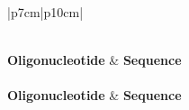 \footnotesize
\begin{longtable}[l]{ |p{7cm}|p{10cm}| }
\caption[Oligonucleotides used in this study]{\textbf{Oligonucleotides Used in This Study}}\\ %
\hline
\label{tab:tableoligos}
\textbf{Oligonucleotide} & \textbf{Sequence} \\
\hline
\endfirsthead
{} \\
\hline
\textbf{Oligonucleotide} & \textbf{Sequence} \\
\hline
\endhead

\end{longtable}
